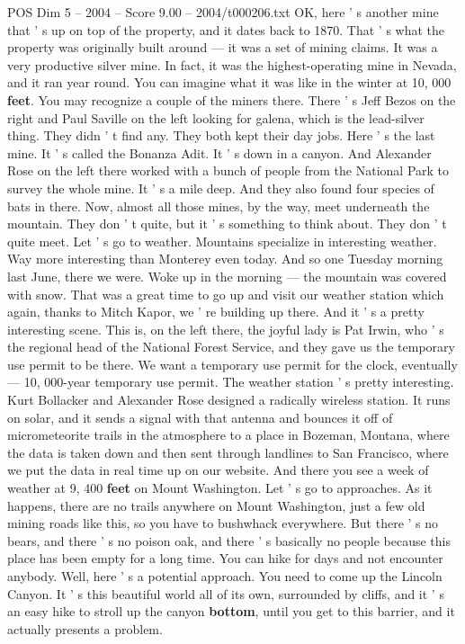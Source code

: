 \begin{textsample}{POS Dim 5 – 2004 – Score 9.00 – 2004/t000206.txt}
OK, here ' s another mine that ' s up on top of the property, and it dates back to 1870.
That ' s what the property was originally built around — it was a set of mining claims.
It was a very productive silver mine.
In fact, it was the highest-operating mine in Nevada, and it ran year round.
You can imagine what it was like in the winter at 10, 000 \textbf{feet}.
You may recognize a couple of the miners there.
There ' s Jeff Bezos on the right and Paul Saville on the left looking for galena, which is the lead-silver thing.
They didn ' t find any.
They both kept their day jobs.
Here ' s the last mine.
It ' s called the Bonanza Adit.
It ' s down in a canyon.
And Alexander Rose on the left there worked with a bunch of people from the National Park to survey the whole mine.
It ' s a mile deep.
And they also found four species of bats in there.
Now, almost all those mines, by the way, meet underneath the mountain.
They don ' t quite, but it ' s something to think about.
They don ' t quite meet.
Let ' s go to weather.
Mountains specialize in interesting weather.
Way more interesting than Monterey even today.
And so one Tuesday morning last June, there we were.
Woke up in the morning — the mountain was covered with snow.
That was a great time to go up and visit our weather station which again, thanks to Mitch Kapor, we ' re building up there.
And it ' s a pretty interesting scene.
This is, on the left there, the joyful lady is Pat Irwin, who ' s the regional head of the National Forest Service, and they gave us the temporary use permit to be there.
We want a temporary use permit for the clock, eventually — 10, 000-year temporary use permit.
The weather station ' s pretty interesting.
Kurt Bollacker and Alexander Rose designed a radically wireless station.
It runs on solar, and it sends a signal with that antenna and bounces it off of micrometeorite trails in the atmosphere to a place in Bozeman, Montana, where the data is taken down and then sent through landlines to San Francisco, where we put the data in real time up on our website.
And there you see a week of weather at 9, 400 \textbf{feet} on Mount Washington.
Let ' s go to approaches.
As it happens, there are no trails anywhere on Mount Washington, just a few old mining roads like this, so you have to bushwhack everywhere.
But there ' s no bears, and there ' s no poison oak, and there ' s basically no people because this place has been empty for a long time.
You can hike for days and not encounter anybody.
Well, here ' s a potential approach.
You need to come up the Lincoln Canyon.
It ' s this beautiful world all of its own, surrounded by cliffs, and it ' s an easy hike to stroll up the canyon \textbf{bottom}, until you get to this barrier, and it actually presents a problem.

\end{textsample}
